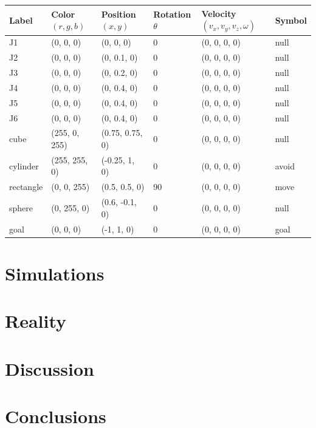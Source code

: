 \documentclass[doublespace,draft,nopageskip]{VTthesis} %
\begin{document}
 	\begin{tiny}
		\begin{center}
			\begin{tabular}{ | m{1cm} | m{1.75cm}| m{2cm} | m{1.5cm} | m{3cm} | m{1cm} | }
				\hline
				\textbf{Label} & \textbf{Color $(r, g, b)$} & \textbf{Position $(x,y)$} & \textbf{Rotation $\theta$} & \textbf{Velocity $(v_x, v_y, v_z, \omega)$} & \textbf{Symbol} \\
				\hline
				J1 & (0, 0, 0) & (0, 0, 0) & 0\textdegree & (0, 0, 0, 0) & null \\ 
				\hline
				J2 & (0, 0, 0) & (0, 0.1, 0) & 0\textdegree & (0, 0, 0, 0) & null\\ 
				\hline
				J3 & (0, 0, 0) & (0, 0.2, 0) & 0\textdegree & (0, 0, 0, 0) & null\\ 
				\hline
				J4 & (0, 0, 0) & (0, 0.4, 0) & 0\textdegree & (0, 0, 0, 0) & null\\ 
				\hline
				J5 & (0, 0, 0) & (0, 0.4, 0) & 0\textdegree & (0, 0, 0, 0) & null \\ 
				\hline
				J6 & (0, 0, 0) & (0, 0.4, 0) & 0\textdegree & (0, 0, 0, 0)& null \\ 
				\hline
				cube & (255, 0, 255) & (0.75, 0.75, 0) & 0\textdegree & (0, 0, 0, 0) & null\\ 
				\hline
				cylinder & (255, 255, 0) & (-0.25, 1, 0) & 0\textdegree & (0, 0, 0, 0) & avoid\\ 
				\hline
				rectangle & (0, 0, 255) & (0.5, 0.5, 0) & 90\textdegree & (0, 0, 0, 0) & move\\ 
				\hline
				sphere & (0, 255, 0) & (0.6, -0.1, 0) & 0\textdegree & (0, 0, 0, 0) & null\\ 
				\hline
				goal & (0, 0, 0) & (-1, 1, 0) & 0\textdegree & (0, 0, 0, 0) & goal\\ 
				\hline
			\end{tabular}
		\end{center}
	\end{tiny}
 


	\chapter{Simulations} \label{ch:simulations}
	\chapter{Reality} \label{ch:reality}
	\chapter{Discussion} \label{ch:discussion}
	\chapter{Conclusions} \label{ch:conclusions}

\end{document}
